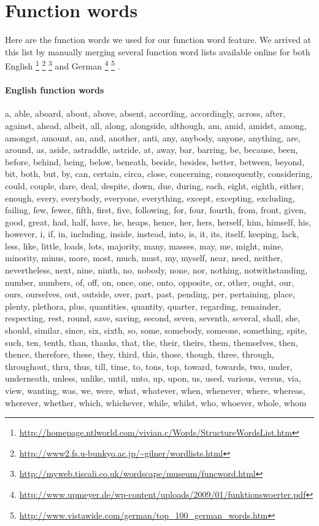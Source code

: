 
\section{Function words}
\label{sec:app_function_words}
Here are the function words we used for our function word feature. We arrived at this list by manually merging several function word lists available online for both English
\footnote{\url{http://homepage.ntlworld.com/vivian.c/Words/StructureWordsList.htm}} 
\footnote{\url{http://www2.fs.u-bunkyo.ac.jp/~gilner/wordlists.html}} 
\footnote{\url{http://myweb.tiscali.co.uk/wordscape/museum/funcword.html}} 
and German
\footnote{\url{http://www.upmeyer.de/wp-content/uploads/2009/01/funktionswoerter.pdf}}
\footnote{\url{http://www.vistawide.com/german/top_100_german_words.htm}}
.


\paragraph{English function words}
a, able, aboard, about, above, absent, according, accordingly, across, after, against, ahead, albeit, all, along, alongside, although, am, amid, amidst, among, amongst, amount, an, and, another, anti, any, anybody, anyone, anything, are, around, as, aside, astraddle, astride, at, away, bar, barring, be, because, been, before, behind, being, below, beneath, beside, besides, better, between, beyond, bit, both, but, by, can, certain, circa, close, concerning, consequently, considering, could, couple, dare, deal, despite, down, due, during, each, eight, eighth, either, enough, every, everybody, everyone, everything, except, excepting, excluding, failing, few, fewer, fifth, first, five, following, for, four, fourth, from, front, given, good, great, had, half, have, he, heaps, hence, her, hers, herself, him, himself, his, however, i, if, in, including, inside, instead, into, is, it, its, itself, keeping, lack, less, like, little, loads, lots, majority, many, masses, may, me, might, mine, minority, minus, more, most, much, must, my, myself, near, need, neither, nevertheless, next, nine, ninth, no, nobody, none, nor, nothing, notwithstanding, number, numbers, of, off, on, once, one, onto, opposite, or, other, ought, our, ours, ourselves, out, outside, over, part, past, pending, per, pertaining, place, plenty, plethora, plus, quantities, quantity, quarter, regarding, remainder, respecting, rest, round, save, saving, second, seven, seventh, several, shall, she, should, similar, since, six, sixth, so, some, somebody, someone, something, spite, such, ten, tenth, than, thanks, that, the, their, theirs, them, themselves, then, thence, therefore, these, they, third, this, those, though, three, through, throughout, thru, thus, till, time, to, tons, top, toward, towards, two, under, underneath, unless, unlike, until, unto, up, upon, us, used, various, versus, via, view, wanting, was, we, were, what, whatever, when, whenever, where, whereas, wherever, whether, which, whichever, while, whilst, who, whoever, whole, whom


